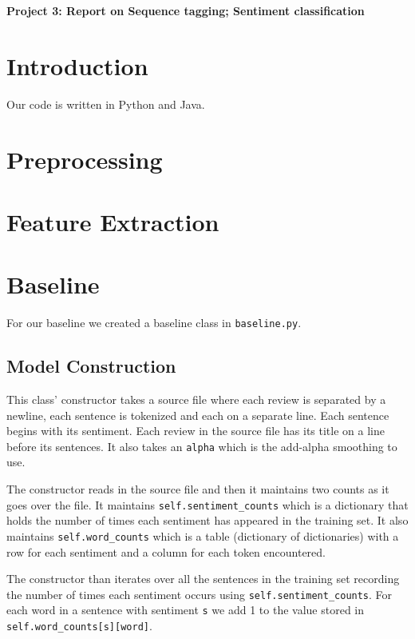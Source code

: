 \documentclass{article}
\begin{document}
\begin{center}\textbf{Project 3: Report on Sequence tagging; Sentiment classification}\end{center}

\section{Introduction}

Our code is written in Python and Java.

\section{Preprocessing}
\section{Feature Extraction}
\section{Baseline}

For our baseline we created a baseline class in \texttt{baseline.py}.

\subsection{Model Construction}

This class' constructor takes a source file where each review is separated by a newline, each sentence is tokenized and each on a separate line. Each sentence begins with its sentiment. Each review in the source file has its title on a line before its sentences. It also takes an \texttt{alpha} which is the add-alpha smoothing to use.

The constructor reads in the source file and then it maintains two counts as it goes over the file. It maintains \texttt{self.sentiment\_counts} which is a dictionary that holds the number of times each sentiment has appeared in the training set. It also maintains \texttt{self.word\_counts} which is a table (dictionary of dictionaries) with a row for each sentiment and a column for each token encountered. 

The constructor than iterates over all the sentences in the training set recording the number of times each sentiment occurs using \texttt{self.sentiment\_counts}. For each word in a sentence with sentiment \texttt{s} we add 1 to the value stored in \texttt{self.word\_counts[s][word]}. 
\end{document}
